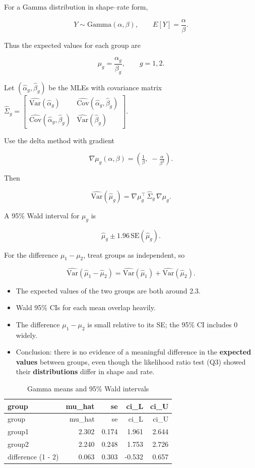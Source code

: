 \documentclass[
]{article}
\providecommand{\tightlist}{%
  \setlength{\itemsep}{0pt}\setlength{\parskip}{0pt}}
\begin{document}
For a Gamma distribution in shape--rate form,

\[
Y \sim \mathrm{Gamma}(\alpha,\beta),\qquad
E[Y] = \frac{\alpha}{\beta}.
\]

Thus the expected values for each group are

\[
\mu_g = \frac{\alpha_g}{\beta_g},\qquad g=1,2.
\]

Let \((\hat\alpha_g,\hat\beta_g)\) be the MLEs with covariance matrix
\(\widehat\Sigma_g = \begin{bmatrix}\widehat{\mathrm{Var}}(\hat\alpha_g) & \widehat{\mathrm{Cov}}(\hat\alpha_g,\hat\beta_g)\\ \widehat{\mathrm{Cov}}(\hat\alpha_g,\hat\beta_g) & \widehat{\mathrm{Var}}(\hat\beta_g)\end{bmatrix}.\)

Use the delta method with gradient

\[
\nabla\mu_g(\alpha,\beta) = \left(\tfrac{1}{\beta},\; -\tfrac{\alpha}{\beta^2}\right).
\]

Then

\[
\widehat{\mathrm{Var}}(\hat\mu_g)
= \nabla\mu_g^\top \,\widehat\Sigma_g \,\nabla\mu_g.
\]

A 95\% Wald interval for \(\mu_g\) is

\[
\hat\mu_g \pm 1.96\,\mathrm{SE}(\hat\mu_g).
\]

For the difference \(\mu_1-\mu_2\), treat groups as independent, so

\[
\widehat{\mathrm{Var}}(\hat\mu_1-\hat\mu_2)
= \widehat{\mathrm{Var}}(\hat\mu_1)+\widehat{\mathrm{Var}}(\hat\mu_2).
\]

\begin{itemize}
\tightlist
\item
  The expected values of the two groups are both around 2.3.
\item
  Wald 95\% CIs for each mean overlap heavily.
\item
  The difference \(\mu_1-\mu_2\) is small relative to its SE; the 95\%
  CI includes 0 widely.
\item
  Conclusion: there is no evidence of a meaningful difference in the
  \textbf{expected values} between groups, even though the likelihood
  ratio test (Q3) showed their \textbf{distributions} differ in shape
  and rate.
\end{itemize}

\begin{longtable}[]{@{}lrrrr@{}}
\caption{Gamma means and 95\% Wald intervals}\tabularnewline
\toprule\noalign{}
group & mu\_hat & se & ci\_L & ci\_U \\
\midrule\noalign{}
\endfirsthead
\toprule\noalign{}
group & mu\_hat & se & ci\_L & ci\_U \\
\midrule\noalign{}
\endhead
\bottomrule\noalign{}
\endlastfoot
group1 & 2.302 & 0.174 & 1.961 & 2.644 \\
group2 & 2.240 & 0.248 & 1.753 & 2.726 \\
difference (1 - 2) & 0.063 & 0.303 & -0.532 & 0.657 \\
\end{longtable}
\end{document}
